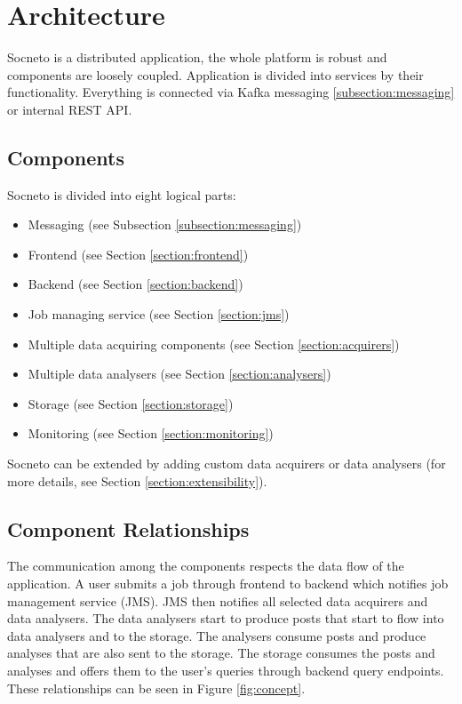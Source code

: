 \section{Architecture}

Socneto is a distributed application, the whole platform is robust and components are loosely coupled. Application is divided into services by their functionality. Everything is connected via Kafka messaging \ref{subsection:messaging} or internal REST API.

\subsection{Components}

Socneto is divided into eight logical parts:

\begin{itemize}
    \item Messaging (see Subsection \ref{subsection:messaging})
    \item Frontend (see Section \ref{section:frontend})
    \item Backend (see Section \ref{section:backend})
    \item Job managing service (see Section \ref{section:jms})
    \item Multiple data acquiring components (see Section \ref{section:acquirers})
    \item Multiple data analysers (see Section \ref{section:analysers}) 
    \item Storage (see Section \ref{section:storage})
    \item Monitoring (see Section \ref{section:monitoring})
\end{itemize}

Socneto can be extended by adding custom data acquirers or data analysers (for more details, see Section \ref{section:extensibility}). 

\subsection{Component Relationships}

The communication among the components respects the data flow of the application. A user submits a job through frontend to backend which notifies job management service (JMS). JMS then notifies all selected data acquirers and data analysers. The data analysers start to produce posts that start to flow into data analysers and to the storage. The analysers consume posts and produce analyses that are also sent to the storage. The storage consumes the posts and analyses and offers them to the user's queries through backend query endpoints. These relationships can be seen in Figure \ref{fig:concept}.

